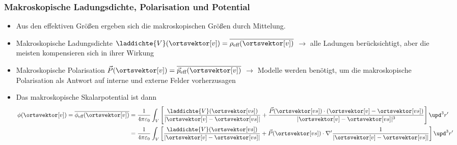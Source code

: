 \begin{frame}

  \frametitle{Makroskopische Ladungsdichte, Polarisation und Potential}
  \begin{itemize}[<+->]
  \item Aus den effektiven Größen ergeben sich die \alert{makroskopischen} Größen durch Mittelung.
  \item \alert{Makroskopische Ladungsdichte} $\laddichte{V}(\ortsvektor[v]) = \overline{\rho_{\text{eff}}(\ortsvektor[v])} $ $\to$ alle Ladungen berücksichtigt, aber die meisten kompensieren sich in ihrer Wirkung
  \item \alert{Makroskopische Polarisation} $\vec{P}(\ortsvektor[v]) = \overline{\vec{p}_{\text{eff}}(\ortsvektor[v])} $ $\to$ \alert{Modelle} werden benötigt, um die makroskopische Polarisation als Antwort auf interne und externe Felder vorherzusagen 
  \item Das \alert{makroskopische Skalarpotential} ist dann
    \begin{align*}
      \phi (\ortsvektor[v]) = \overline{\phi _{\text{eff}}(\ortsvektor[v])} &= \frac{1}{4\pi\varepsilon_0} \int_V \left[ \frac{\laddichte{V}(\ortsvektor[vs])}{|\ortsvektor[v] - \ortsvektor[vs] |} + \frac{\vec{P}(\ortsvektor[vs])  \cdot (\ortsvektor[v] - \ortsvektor[vs] )}{|\ortsvektor[v] - \ortsvektor[vs] |^3} \right] \upd^3 r' \\
      &= \frac{1}{4\pi\varepsilon_0} \int_V \left[ \frac{\laddichte{V}(\ortsvektor[vs])}{|\ortsvektor[v] - \ortsvektor[vs] |} + \vec{P}(\ortsvektor[vs])  \cdot \nabla' \frac{1}{|\ortsvektor[v] - \ortsvektor[vs] |} \right] \upd^3 r'
      \end{align*}
\end{itemize}
  
  \end{frame}

